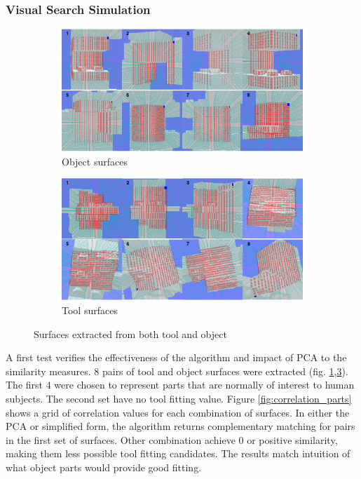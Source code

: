 \documentclass[
    floatsintext
]{article}
\begin{document}
\subsubsection{Visual Search Simulation}
\begin{figure}[h]
  \centering
  \begin{subfigure}{1\textwidth}
    \includegraphics[width=1\linewidth]{./figures/object_parts.png}
    \caption{Object surfaces}
    \label{fig:obj_parts}
  \end{subfigure}
  \begin{subfigure}{1\textwidth}
    \includegraphics[width=1\linewidth]{./figures/tool_parts.png}
    \caption{Tool surfaces}
    \label{fig:tool_part}
  \end{subfigure}
  \caption{Surfaces extracted from both tool and object}
\end{figure}

A first test verifies the effectiveness of the algorithm and impact of PCA to the similarity measures. 
$8$ pairs of tool and object surfaces were extracted (fig. \ref{fig:obj_parts},\ref{fig:tool_part}). 
The first $4$ were chosen to represent parts that are normally of interest to human subjects. 
The second set have no tool fitting value. 
Figure \ref{fig:correlation_parts} shows a grid of correlation values for each combination of surfaces. 
In either the PCA or simplified form, the algorithm returns complementary matching for pairs in the first set of surfaces. 
Other combination achieve 0 or positive similarity, making them less possible tool fitting candidates. 
The results match intuition of what object parts would provide good fitting. 
\end{document}
